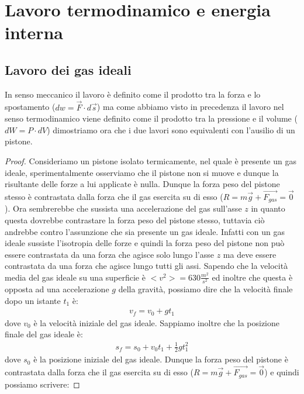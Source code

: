 \section{Lavoro termodinamico e energia interna}
    \subsection{Lavoro dei gas ideali}
        In senso meccanico il lavoro è definito come il prodotto tra la forza e lo spostamento ($dw=\vec{F}\cdot d\vec{s}$) ma come abbiamo visto in precedenza il lavoro nel senso termodinamico viene definito come il prodotto tra la pressione e il volume ($dW=P\cdot dV$) dimostriamo ora che i due lavori sono equivalenti con l'ausilio di un pistone.
        \begin{proof}
            Consideriamo un pistone isolato termicamente, nel quale è presente un gas ideale, sperimentalmente osserviamo che il pistone non si muove e dunque la risultante delle forze a lui applicate è nulla.\newline
            Dunque la forza peso del pistone stesso è contrastata dalla forza che il gas esercita su di esso ($R=m\vec{g}+\vec{F_{gas}}=\vec{0}$). Ora sembrerebbe che sussista una accelerazione del gas sull'asse $z$ in quanto questa dovrebbe contrastare la forza peso del pistone stesso, tuttavia ciò andrebbe contro l'assunzione che sia presente un gas ideale. Infatti con un gas ideale sussiste l'isotropia delle forze e quindi la forza peso del pistone non può essere contrastata da una forza che agisce solo lungo l'asse $z$ ma deve essere contrastata da una forza che agisce lungo tutti gli assi. Sapendo che la velocità media del gas ideale su una superficie è $<v^2>=630 \frac{m^2}{s^2}$ ed inoltre che questa è opposta ad una accelerazione $g$ della gravità, possiamo dire che la velocità finale dopo un istante $t_1$ è:
            \begin{align*}
                v_{f} = v_0 + g t_1
            \end{align*}
            dove $v_0$ è la velocità iniziale del gas ideale. Sappiamo inoltre che la posizione finale del gas ideale è:
            \begin{align*}
                s_{f} = s_0 + v_0 t_1 + \frac{1}{2} g t_1^2
            \end{align*}
            dove $s_0$ è la posizione iniziale del gas ideale. 
            Dunque la forza peso del pistone è contrastata dalla forza che il gas esercita su di esso ($R=m\vec{g}+\vec{F_{gas}}=\vec{0}$) e quindi possiamo scrivere:

\end{proof}

